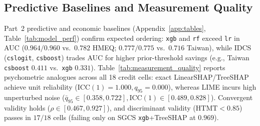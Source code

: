 \documentclass[conference]{IEEEtran}
\begin{document}
\begin{table}[!t]
\centering
\caption{Part~1 Replication Summary (H1a, H1b) and E1 Variance Decomposition (SGCS)}
\label{tab:replication_summary}
\scriptsize
\renewcommand{\arraystretch}{0.76}
\setlength{\tabcolsep}{2.6pt}
\end{table}

\subsection{Predictive Baselines and Measurement Quality}
\label{sec:res_mq}
Part~2 predictive and economic baselines (Appendix~\ref{app:tables}, Table~\ref{tab:model_perf}) confirm expected ordering: \texttt{xgb} and \texttt{rf} exceed \texttt{lr} in AUC ($0.964/0.960$ vs.\ $0.782$ HMEQ; $0.777/0.775$ vs.\ $0.716$ Taiwan), while IDCS (\texttt{cslogit}, \texttt{csboost}) trades AUC for higher prior-threshold savings (e.g., Taiwan \texttt{csboost} $0.411$ vs.\ \texttt{xgb} $0.331$). Table~\ref{tab:measurement_quality} reports psychometric analogues across all 18 credit cells: exact LinearSHAP/TreeSHAP achieve unit reliability ($\mathrm{ICC}(1){=}1.000, q_{95}{=}0.000$), whereas LIME incurs high unperturbed noise ($\bar{q}_{95}\in[0.358,0.722], \mathrm{ICC}(1)\in[0.489,0.828]$). Convergent validity holds ($\rho\in[0.467,0.927]$), and discriminant validity ($\mathrm{HTMT}<0.85$) passes in $17/18$ cells (failing only on SGCS \texttt{xgb}+TreeSHAP at $0.969$).
\end{document}
